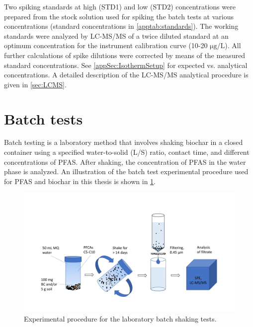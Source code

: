 Two spiking standards at high (STD1) and low (STD2) concentrations were prepared from the stock solution used for spiking the batch tests at various concentrations (standard concentrations in \cref{apptab:standards}). The working standards were analyzed by LC-MS/MS of a twice diluted standard at an optimum concentration for the instrument calibration curve (10-20 $\mathrm{\mu g/L}$). All further calculations of spike dilutions were corrected by means of the measured standard concentrations. See \cref{appSec:IsothermSetup} for expected vs. analytical concentrations. A detailed description of the LC-MS/MS analytical procedure is given in \cref{sec:LCMS}. 



\section{Batch tests \label{sec:batch}}
Batch testing is a laboratory method that involves shaking biochar in a closed container using a specified water-to-solid (L/S) ratio, contact time, and different concentrations of PFAS. After shaking, the concentration of PFAS in the water phase is analyzed. An illustration of the batch test experimental procedure used for PFAS and biochar in this thesis is shown in \cref{fig:batchtest_setup}.

\begin{figure}[htb]
    \centering
    \includegraphics[width=\textwidth,trim={0 2cm 0 3.2cm},clip]{Diagrams/Batch_test.pdf}
    \caption{Experimental procedure for the laboratory batch shaking tests.}
    \label{fig:batchtest_setup}
\end{figure}

